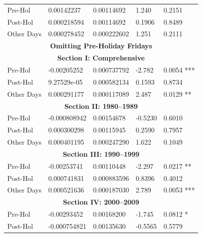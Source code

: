 \documentclass[11pt, english]{article}
\begin{document}
\begin{center}
\begin{longtable}{p{2cm}p{2cm}p{2cm}p{2cm}p{2cm}}
                \hline            
                Pre-Hol & 0.00142237 & 0.00114692 & 1.240 & 0.2151\\ 
                Post-Hol & 0.000218594 & 0.00114692 & 0.1906 & 0.8489\\  
                Other Days & 0.000278452 & 0.000222602 & 1.251 & 0.2111\\
                \hline
                \hline                                 
                \multicolumn{5}{c}{\textbf{Omitting Pre-Holiday Fridays}}\\
		\hline
                \hline                                                 
                \multicolumn{5}{c}{\textbf{Section I: Comprehensive}}\\
                \hline            
                Pre-Hol & -0.00205252 & 0.000737792 & -2.782 & 0.0054 ***\\ 
                Post-Hol & 9.27529e-05 & 0.000582134 & 0.1593 & 0.8734\\  
                Other Days & 0.000291177 & 0.000117089 & 2.487 & 0.0129 **\\
                \hline                                          
                \multicolumn{5}{c}{\textbf{Section II: 1980--1989}}\\   
                \hline            
                Pre-Hol & -0.000808942 & 0.00154678 & -0.5230 & 0.6010\\ 
                Post-Hol & 0.000300298 & 0.00115945 & 0.2590 & 0.7957\\  
                Other Days & 0.000401195 & 0.000247290 & 1.622 & 0.1049\\
                \hline 
                \multicolumn{5}{c}{\textbf{Section III: 1990--1999}}\\   
                \hline            
                Pre-Hol & -0.00253741 & 0.00110448 & -2.297 & 0.0217 **\\ 
                Post-Hol & 0.000741831 & 0.000883596 & 0.8396 & 0.4012\\  
                Other Days & 0.000521636 & 0.000187030 & 2.789 & 0.0053 ***\\
                \hline 
                \multicolumn{5}{c}{\textbf{Section IV: 2000--2009}}\\   
                \hline                                          
                Pre-Hol & -0.00293452 & 0.00168200 & -1.745 & 0.0812 *\\
                Post-Hol & -0.000754821 & 0.00135630 & -0.5565 & 0.5779\\  

\end{longtable}
\end{center}
\end{document}
